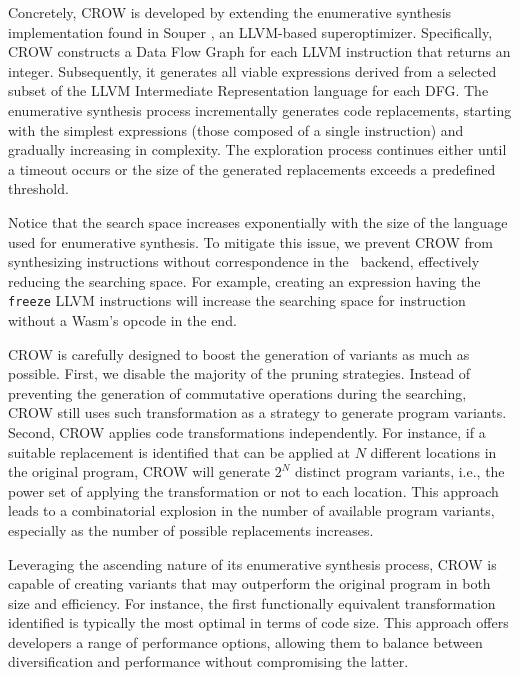Concretely, CROW is developed by extending the enumerative synthesis implementation found in Souper \cite{Sasnauskas2017Souper:Superoptimizer}, an LLVM-based superoptimizer. 
Specifically, CROW constructs a Data Flow Graph for each LLVM instruction that returns an integer. 
Subsequently, it generates all viable expressions derived from a selected subset of the LLVM Intermediate Representation language for each DFG.
The enumerative synthesis process incrementally generates code replacements, starting with the simplest expressions (those composed of a single instruction) and gradually increasing in complexity. 
The exploration process continues either until a timeout occurs or the size of the generated replacements exceeds a predefined threshold.


Notice that the search space increases exponentially with the size of the language used for enumerative synthesis. 
To mitigate this issue, we prevent CROW from synthesizing instructions without correspondence in the \wasm\ backend, effectively reducing the searching space. 
For example, creating an expression having the  \texttt{freeze} LLVM instructions will increase the searching space for instruction without a Wasm's opcode in the end.

CROW is carefully designed to boost the generation of variants as much as possible.
First, we disable the majority of the pruning strategies.
Instead of preventing the generation of commutative operations during the searching, CROW still uses such transformation as a strategy to generate program variants. 
Second, CROW applies code transformations independently. 
For instance, if a suitable replacement is identified that can be applied at $N$ different locations in the original program, CROW will generate $2^N$ distinct program variants, i.e., the power set of applying the transformation or not to each location. 
This approach leads to a combinatorial explosion in the number of available program variants, especially as the number of possible replacements increases.

Leveraging the ascending nature of its enumerative synthesis process, CROW is capable of creating variants that may outperform the original program in both size and efficiency. 
For instance, the first functionally equivalent transformation identified is typically the most optimal in terms of code size. 
This approach offers developers a range of performance options, allowing them to balance between diversification and performance without compromising the latter.


